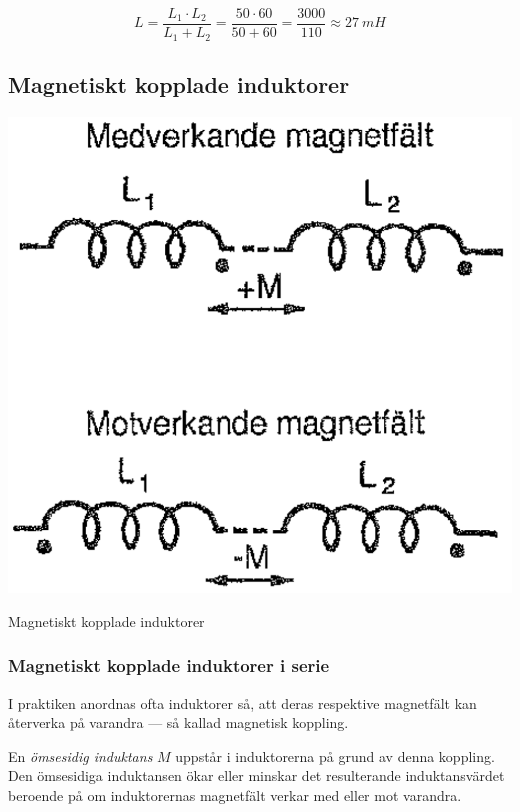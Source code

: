 \[ L = \frac{L_1 \cdot L_2}{L_1 + L_2} = \frac{50 \cdot 60}{50 + 60} =
\frac{3000}{110} \approx \SI{27}{mH} \]


\subsection{Magnetiskt kopplade induktorer}

\begin{marginfigure}%
  \includegraphics[width=1\textwidth]{images/cropped_pdfs/bild_2_3-07.pdf}
  \caption{Magnetiskt kopplade induktorer}
  \label{fig:BildII3-07}
\end{marginfigure}

\subsubsection{Magnetiskt kopplade induktorer i serie}

I praktiken anordnas ofta induktorer så, att deras respektive magnetfält kan
återverka på varandra --- så kallad magnetisk koppling.

En \emph{ömsesidig induktans} \(M\) uppstår i induktorerna på grund av denna
koppling.
Den ömsesidiga induktansen ökar eller minskar det resulterande induktansvärdet
beroende på om induktorernas magnetfält verkar med eller mot varandra.

